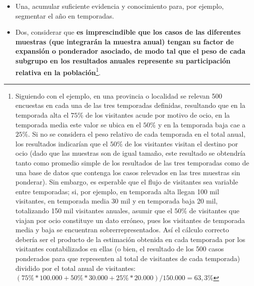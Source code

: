 \documentclass[
]{book}
\begin{document}
\begin{itemize}
\item
  Una, acumular suficiente evidencia y conocimiento para, por ejemplo, segmentar el año en temporadas.
\item
  Dos, considerar que \textbf{es imprescindible que los casos de las diferentes muestras (que integrarán la muestra anual) tengan su factor de expansión o ponderador asociado, de modo tal que el peso de cada subgrupo en los resultados anuales represente su participación relativa en la población}\footnote{Siguiendo con el ejemplo, en una provincia o localidad se relevan 500 encuestas en cada una de las tres temporadas definidas, resultando que en la temporada alta el \(75\%\) de los visitantes acude por motivo de ocio, en la temporada media este valor se ubica en el \(50\%\) y en la temporada baja cae a \(25\%\). Si no se considera el peso relativo de cada temporada en el total anual, los resultados indicarían que el \(50\%\) de los visitantes visitan el destino por ocio (dado que las muestras son de igual tamaño, este resultado se obtendría tanto como promedio simple de los resultados de las tres temporadas como de una base de datos que contenga los casos relevados en las tres muestras sin ponderar). Sin embargo, es esperable que el flujo de visitantes sea variable entre temporadas; si, por ejemplo, en temporada alta llegan 100 mil visitantes, en temporada media 30 mil y en temporada baja 20 mil, totalizando 150 mil visitantes anuales, asumir que el \(50\%\) de visitantes que viajan por ocio constituye un dato erróneo, pues los visitantes de temporada media y baja se encuentran sobrerrepresentados. Así el cálculo correcto debería ser el producto de la estimación obtenida en cada temporada por los visitantes contabilizados en ellas (o bien, el resultado de los 500 casos ponderados para que representen al total de visitantes de cada temporada) dividido por el total anual de visitantes: \((75\%*100.000 + 50\%*30.000 + 25\%*20.000)/150.000=63,3\%\)}.
\end{itemize}
\end{document}
